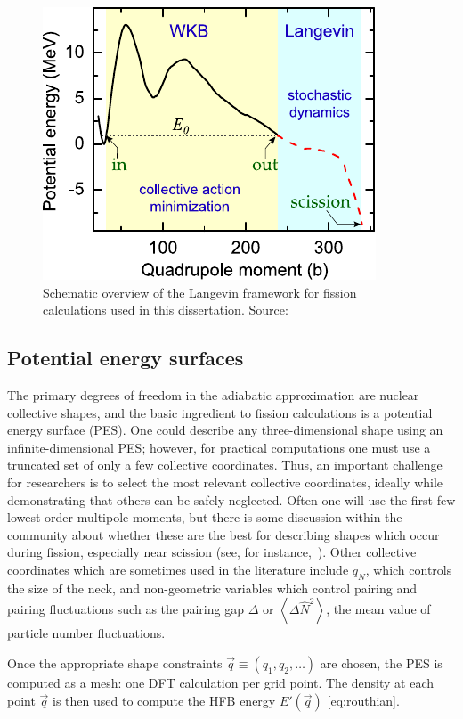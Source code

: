 \begin{figure}
	\centering
	\includegraphics[width=0.5\linewidth]{TeX_files/methods_overview}
	\caption[Schematic overview of the Langevin framework for fission calculations used in this dissertation]{Schematic overview of the Langevin framework for fission calculations used in this dissertation. Source:~\cite{Sadhukhan2016}}
	\label{fig:methodsoverview}
\end{figure}

\subsection{Potential energy surfaces}
The primary degrees of freedom in the adiabatic approximation are nuclear collective shapes, and the basic ingredient to fission calculations is a potential energy surface (PES). One could describe any three-dimensional shape using an infinite-dimensional PES; however, for practical computations one must use a truncated set of only a few collective coordinates. Thus, an important challenge for researchers is to select the most relevant collective coordinates, ideally while demonstrating that others can be safely neglected. Often one will use the first few lowest-order multipole moments, but there is some discussion within the community about whether these are the best for describing shapes which occur during fission, especially near scission (see, for instance,~\cite{younes2012}). Other collective coordinates which are sometimes used in the literature include $q_N$, which controls the size of the neck, and non-geometric variables which control pairing and pairing fluctuations such as the pairing gap $\Delta$ or $\left\langle \Delta \hat{N}^2 \right\rangle$, the mean value of particle number fluctuations.

Once the appropriate shape constraints $\vec{q}\equiv(q_1, q_2, \dots)$ are chosen, the PES is computed as a mesh: one DFT calculation per grid point. The density at each point $\vec{q}$ is then used to compute the HFB energy $E'(\vec{q})$ \ref{eq:routhian}.

